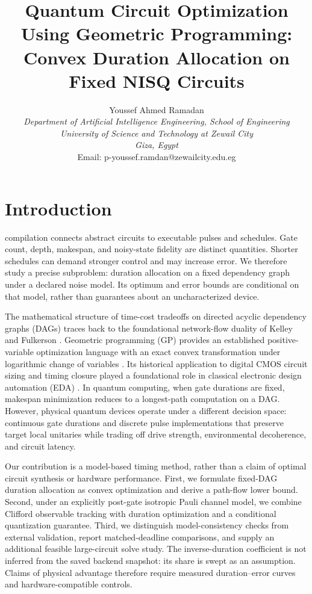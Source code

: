 \documentclass[10pt,letterpaper,journal]{IEEEtran}
\title{{\fontsize{17}{20}\selectfont\bfseries Quantum Circuit Optimization Using Geometric Programming:\\ Convex Duration Allocation on Fixed NISQ Circuits}}
\author{{\fontsize{11}{13}\selectfont Youssef Ahmed Ramadan}\\[3pt]
{\fontsize{10}{12}\selectfont\itshape Department of Artificial Intelligence Engineering, School of Engineering}\\
{\fontsize{10}{12}\selectfont\itshape University of Science and Technology at Zewail City}\\
{\fontsize{10}{12}\selectfont\itshape Giza, Egypt}\\
{\fontsize{10}{12}\selectfont Email: p-youssef.ramdan@zewailcity.edu.eg}}
\begin{document}
\maketitle


\section{Introduction}
 compilation connects abstract circuits to executable pulses and schedules. Gate count, depth, makespan, and noisy-state fidelity are distinct quantities. Shorter schedules can demand stronger control and may increase error. We therefore study a precise subproblem: duration allocation on a fixed dependency graph under a declared noise model. Its optimum and error bounds are conditional on that model, rather than guarantees about an uncharacterized device.

The mathematical structure of time-cost tradeoffs on directed acyclic dependency graphs (DAGs) traces back to the foundational network-flow duality of Kelley \cite{kelley} and Fulkerson \cite{fulkerson}. Geometric programming (GP) provides an established positive-variable optimization language with an exact convex transformation under logarithmic change of variables \cite{boydgp}. Its historical application to digital CMOS circuit sizing and timing closure played a foundational role in classical electronic design automation (EDA) \cite{boyddigital}. In quantum computing, when gate durations are fixed, makespan minimization reduces to a longest-path computation on a DAG. However, physical quantum devices operate under a different decision space: continuous gate durations and discrete pulse implementations that preserve target local unitaries while trading off drive strength, environmental decoherence, and circuit latency.

Our contribution is a model-based timing method, rather than a claim of optimal circuit synthesis or hardware performance. First, we formulate fixed-DAG duration allocation as convex optimization and derive a path-flow lower bound. Second, under an explicitly post-gate isotropic Pauli channel model, we combine Clifford observable tracking with duration optimization and a conditional quantization guarantee. Third, we distinguish model-consistency checks from external validation, report matched-deadline comparisons, and supply an additional feasible large-circuit solve study. The inverse-duration coefficient is not inferred from the saved backend snapshot: its share is swept as an assumption. Claims of physical advantage therefore require measured duration--error curves and hardware-compatible controls.
\end{document}
